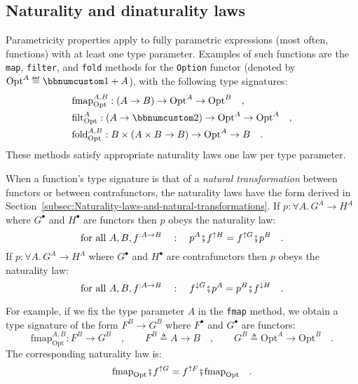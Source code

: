 \subsection{Naturality and dinaturality laws\label{sec:Naturality-laws-for-fully-parametric-functions} }

Parametricity properties apply to fully parametric expressions (most
often, functions) with at least one type parameter. Examples of such
functions are the \lstinline!map!, \lstinline!filter!, and \lstinline!fold!
methods for the \lstinline!Option! functor (denoted by $\text{Opt}^{A}\triangleq\bbnum 1+A$),
with the following type signatures:
\begin{align*}
 & \text{fmap}_{\text{Opt}}^{A,B}:\left(A\rightarrow B\right)\rightarrow\text{Opt}^{A}\rightarrow\text{Opt}^{B}\quad,\\
 & \text{filt}_{\text{Opt}}^{A}:\left(A\rightarrow\bbnum 2\right)\rightarrow\text{Opt}^{A}\rightarrow\text{Opt}^{A}\quad,\\
 & \text{fold}_{\text{Opt}}^{A,B}:B\times\left(A\times B\rightarrow B\right)\rightarrow\text{Opt}^{A}\rightarrow B\quad.
\end{align*}
These methods satisfy appropriate naturality laws \textemdash{} one
law per type parameter. 

When a function\textsf{'}s type signature is that of a \emph{natural transformation}
between functors or between contrafunctors, the naturality laws have
the form derived in Section~\ref{subsec:Naturality-laws-and-natural-transformations}.
If $p:\forall A.\,G^{A}\rightarrow H^{A}$ where $G^{\bullet}$ and
$H^{\bullet}$ are functors then $p$ obeys the naturality law:
\begin{equation}
\text{for all }A,B,f^{:A\rightarrow B}\quad:\quad p^{A}\bef f^{\uparrow H}=f^{\uparrow G}\bef p^{B}\quad.\label{eq:naturality-law-for-functors}
\end{equation}
If $p:\forall A.\,G^{A}\rightarrow H^{A}$ where $G^{\bullet}$ and
$H^{\bullet}$ are contrafunctors then $p$ obeys the naturality law:
\begin{equation}
\text{for all }A,B,f^{:A\rightarrow B}\quad:\quad f^{\downarrow G}\bef p^{A}=p^{B}\bef f^{\downarrow H}\quad.\label{eq:naturality-law-for-contrafunctors}
\end{equation}

For example, if we fix the type parameter $A$ in the \lstinline!fmap!
method, we obtain a type signature of the form $F^{B}\rightarrow G^{B}$
where $F^{\bullet}$ and $G^{\bullet}$ are functors:
\[
\text{fmap}_{\text{Opt}}^{A,B}:F^{B}\rightarrow G^{B}\quad,\quad\quad F^{B}\triangleq A\rightarrow B\quad,\quad\quad G^{B}\triangleq\text{Opt}^{A}\rightarrow\text{Opt}^{B}\quad.
\]
The corresponding naturality law is:
\[
\text{fmap}_{\text{Opt}}\bef f^{\uparrow G}=f^{\uparrow F}\bef\text{fmap}_{\text{Opt}}\quad.
\]

